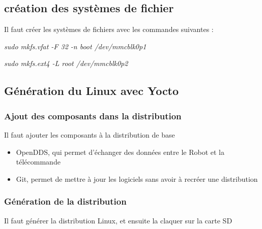 \subsection{création des systèmes de fichier}

Il faut créer les systèmes de fichiers avec les commandes suivantes : 


\textit{sudo mkfs.vfat -F 32 -n boot /dev/mmcblk0p1}

\textit{sudo mkfs.ext4 -L root /dev/mmcblk0p2}



\subsection{Génération du Linux avec Yocto}


\subsubsection{Ajout des composants dans la distribution}

Il faut ajouter les composants à la distribution de base
\begin{itemize}

\item OpenDDS, qui permet d'échanger des données entre le Robot et la télécommande

\item Git, permet de mettre à jour les logiciels sans avoir à recréer une distribution

\end{itemize}

\subsubsection{Génération de la distribution}
Il faut générer la distribution Linux, et ensuite la claquer sur la carte SD





